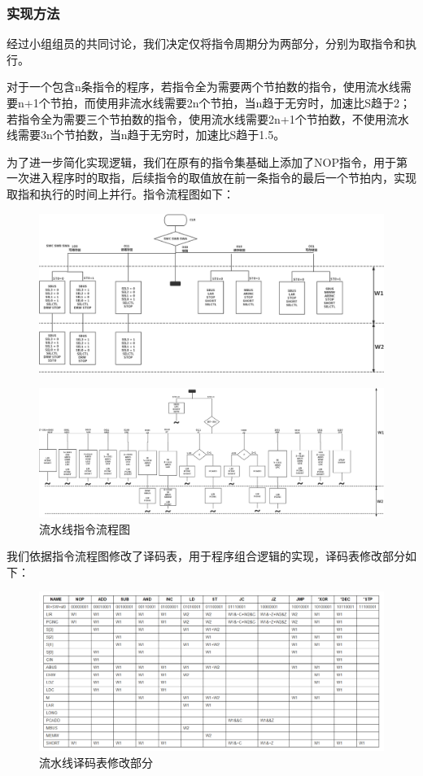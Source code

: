 \subsubsection{实现方法}
\par 
经过小组组员的共同讨论，我们决定仅将指令周期分为两部分，分别为取指令和执行。
\par
对于一个包含n条指令的程序，若指令全为需要两个节拍数的指令，使用流水线需要n+1个节拍，而使用非流水线需要2n个节拍，当n趋于无穷时，加速比S趋于2；若指令全为需要三个节拍数的指令，使用流水线需要2n+1个节拍数，不使用流水线需要3n个节拍数，当n趋于无穷时，加速比S趋于1.5。
\par 
为了进一步简化实现逻辑，我们在原有的指令集基础上添加了NOP指令，用于第一次进入程序时的取指，后续指令的取值放在前一条指令的最后一个节拍内，实现取指和执行的时间上并行。指令流程图如下：
\begin{figure}[hbt!]
    \centering
    \label{流水线指令流程图}
    \includegraphics[width=\textwidth]{figures/chapter3/流水线指令流程图1.png}
\end{figure}
\newpage
\begin{figure}[hbt!]
    \centering
    \label{流水线指令流程图}
    \includegraphics[width=\textwidth]{figures/chapter3/流水线指令流程图2.png}
    \caption{流水线指令流程图}
\end{figure}
\par
我们依据指令流程图修改了译码表，用于程序组合逻辑的实现，译码表修改部分如下：
\begin{figure}[hbt!]
    \centering
    \label{流水线译码表修改部分}
    \includegraphics[width=\textwidth]{figures/chapter3/流水线译码表修改部分.png}
    \caption{流水线译码表修改部分}
\end{figure}



